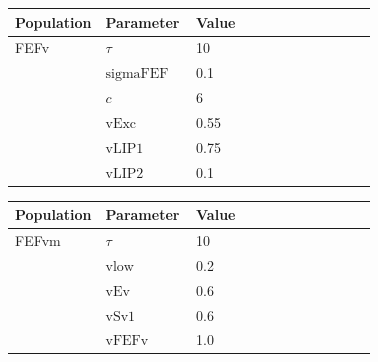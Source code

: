 \documentclass{article}
\begin{document}
\vspace{2ex}

\noindent
\begin{tabularx}{\linewidth}{|p{0.25\linewidth}|p{0.25\linewidth}|X|}\hline
\textbf{Population} & \textbf{Parameter} & \textbf{Value}   \\ \hline

    FEFv             & $\tau$        & 10  \\ \hline

                 & ${\text{sigmaFEF}}$        & 0.1  \\ \hline

                 & $c$        & 6  \\ \hline

                 & ${\text{vExc}}$        & 0.55  \\ \hline

                 & ${\text{vLIP1}}$        & 0.75  \\ \hline

                 & ${\text{vLIP2}}$        & 0.1  \\ \hline

\end{tabularx}

\vspace{2ex}

\noindent
\begin{tabularx}{\linewidth}{|p{0.25\linewidth}|p{0.25\linewidth}|X|}\hline
\textbf{Population} & \textbf{Parameter} & \textbf{Value}   \\ \hline

    FEFvm             & $\tau$        & 10  \\ \hline

                 & ${\text{vlow}}$        & 0.2  \\ \hline

                 & ${\text{vEv}}$        & 0.6  \\ \hline

                 & ${\text{vSv1}}$        & 0.6  \\ \hline

                 & ${\text{vFEFv}}$        & 1.0  \\ \hline

\end{tabularx}

\vspace{2ex}
\end{document}
